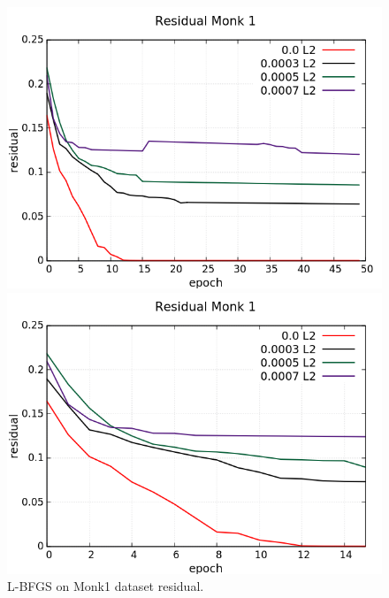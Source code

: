 \begin{figure}[H]
	\centering
	\begin{minipage}[t]{0.5\linewidth}
		\includegraphics[width=\linewidth]{data/LBFGS/Monk1/Monk1_LBFGS_Residual_standard.png}
	\end{minipage}%
	\begin{minipage}[t]{0.5\linewidth}
		\includegraphics[width=\linewidth]{data/LBFGS/Monk1/Monk1_LBFGS_Residual_zoom.png}
	\end{minipage}
	\caption{L-BFGS on Monk1 dataset residual.}
\end{figure}
